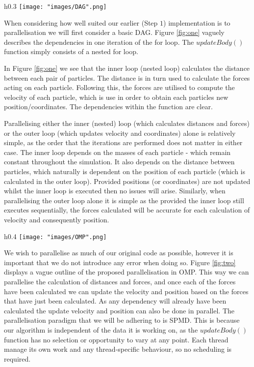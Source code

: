 \documentclass[12pt, a4paper]{article}
\begin{document}
\begin{wrapfigure}{h}{0.3\textwidth}
\texttt{[image: "images/DAG".png]}
\caption{Simplified DAG for the $updateBody()$ function. Here an arrow indicates a dependency.}
\label{fig:one}
\end{wrapfigure}
\hspace{\parindent} When considering how well suited our earlier (Step $1$) implementation is to parallelisation we will first consider a basic DAG. Figure \ref{fig:one} vaguely describes the dependencies in one iteration of the for loop. The $updateBody()$ function simply consists of a nested for loop.
\par In Figure \ref{fig:one} we see that the inner loop (nested loop) calculates the distance between each pair of particles. The distance is in turn used to calculate the forces acting on each particle. Following this, the forces are utilised to compute the velocity of each particle, which is use in order to obtain each particles new position/coordinates. The dependencies within the function are clear.
\par Parallelising either the inner (nested) loop (which calculates distances and forces) or the outer loop (which updates velocity and coordinates) alone is relatively simple, as the order that the iterations are performed does not matter in either case. The inner loop depends on the masses of each particle - which remain constant throughout the simulation. It also depends on the distance between particles, which naturally is dependent on the position of each particle (which is calculated in the outer loop). Provided positions (or coordinates) are not updated whilst the inner loop is executed then no issues will arise. Similarly, when parallelising the outer loop alone it is simple as the provided the inner loop still executes sequentially, the forces calculated will be accurate for each calculation of velocity and consequently position.
 \begin{wrapfigure}{h}{0.4\textwidth}
\texttt{[image: "images/OMP".png]}
\caption{Our proposed OMP solution.}
\label{fig:two}
\end{wrapfigure}
 \par We wish to parallelise as much of our original code as possible, however it is important that we do not introduce any error when doing so. Figure \ref{fig:two} displays a vague outline of the proposed parallelisation in OMP. This way we can parallelise the calculation of distances and forces, and once each of the forces have been calculated we can update the velocity and position based on the forces that have just been calculated. As any dependency will already have been calculated the update velocity and position can also be done in parallel.  The parallelisation paradigm that we will be adhering to is SPMD. This is because our algorithm is independent of the data it is working on, as the $updateBody()$ function has no selection or opportunity to vary at any point. Each thread manage its own work and any thread-specific behaviour, so no scheduling is required.
\end{document}
